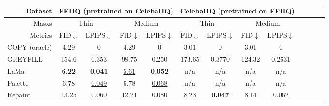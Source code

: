 \begin{table}[H]
\small
\centering
\begin{tabular}{|l|cccccc|cccccc|}
\hline
\multicolumn{1}{|r|}{Dataset} &
  \multicolumn{4}{c|}{FFHQ (pretrained on CelebaHQ)} &
  \multicolumn{4}{c|}{CelebaHQ (pretrained on FFHQ)} \\ \hline
\multicolumn{1}{|r|}{Masks} &
  \multicolumn{2}{c|}{Thin} &
  \multicolumn{2}{c|}{Medium} &
  \multicolumn{2}{c|}{Thin} &
  \multicolumn{2}{c|}{Medium} \\ \hline
\multicolumn{1}{|r|}{Metrics} &
  \multicolumn{1}{c|}{FID$\downarrow$} &
  \multicolumn{1}{c|}{LPIPS$\downarrow$} &
  \multicolumn{1}{c|}{FID$\downarrow$} &
  \multicolumn{1}{c|}{LPIPS$\downarrow$} &
  \multicolumn{1}{c|}{FID$\downarrow$} &
  \multicolumn{1}{c|}{LPIPS$\downarrow$} &
  \multicolumn{1}{c|}{FID$\downarrow$} &
  \multicolumn{1}{c|}{LPIPS$\downarrow$} \\ \hline %
  \rowcolor[gray]{0.7}
COPY (oracle) &
  \multicolumn{1}{c|}{4.29} &
  \multicolumn{1}{c|}{0} &
  \multicolumn{1}{c|}{4.29} &
  \multicolumn{1}{c|}{0} &
  \multicolumn{1}{c|}{3.01} &
  \multicolumn{1}{c|}{0} &
  \multicolumn{1}{c|}{3.01} &
  \multicolumn{1}{c|}{0} 
  \\ \hline
GREYFILL &
  \multicolumn{1}{c|}{154.6} &
  \multicolumn{1}{c|}{0.353} &
  \multicolumn{1}{c|}{98.75} &
  \multicolumn{1}{c|}{0.250} &
  \multicolumn{1}{c|}{173.65} &
  \multicolumn{1}{c|}{0.3770} &
  \multicolumn{1}{c|}{124.32} &
  \multicolumn{1}{c|}{0.2631} 
  \\ \Xhline{4\arrayrulewidth}
LaMa&
  \multicolumn{1}{c|}{\textbf{6.22}} &
  \multicolumn{1}{c|}{\textbf{0.041}} &
  \multicolumn{1}{c|}{{\underline{5.61}}} &
  \multicolumn{1}{c|}{\textbf{0.052}} &
  \multicolumn{1}{c|}{n/a} &
  \multicolumn{1}{c|}{n/a} &
  \multicolumn{1}{c|}{n/a} &
  \multicolumn{1}{c|}{n/a} 
  \\ \hline
Palette &
  \multicolumn{1}{c|}{6.78} &
  \multicolumn{1}{c|}{{\underline{0.049}}} &
  \multicolumn{1}{c|}{6.78} &
  \multicolumn{1}{c|}{{\underline{0.068}}} &
  \multicolumn{1}{c|}{n/a} &
  \multicolumn{1}{c|}{n/a} &
  \multicolumn{1}{c|}{n/a} &
  \multicolumn{1}{c|}{n/a}  
  \\ \Xhline{4\arrayrulewidth}
Repaint &
  \multicolumn{1}{c|}{13.25} &
  \multicolumn{1}{c|}{0.060} &
  \multicolumn{1}{c|}{12.21} &
  \multicolumn{1}{c|}{0.080} &
  \multicolumn{1}{c|}{8.23} &
  \multicolumn{1}{c|}{\textbf{0.047}} &
  \multicolumn{1}{c|}{8.14} &
  \multicolumn{1}{c|}{\underline{0.062}} 

\end{tabular}
\end{table}
